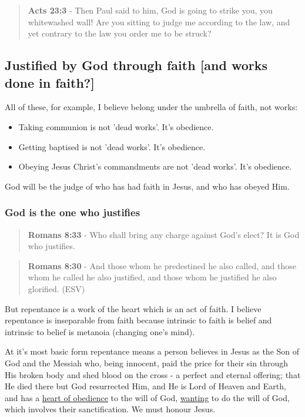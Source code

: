 \documentclass[11pt]{article}
\begin{document}
\begin{quote}
\textbf{Acts 23:3} - Then Paul said to him, God is going to strike you, you whitewashed wall! Are you sitting to judge me according to the law, and yet contrary to the law you order me to be struck?
\end{quote}

\subsection{Justified by God through faith [and works done in faith?]}
\label{sec:org3b4adf2}
All of these, for example,  I believe belong under the umbrella of faith, not works:
\begin{itemize}
\item Taking communion is not 'dead works'. It's obedience.
\item Getting baptised is not 'dead works'. It's obedience.
\item Obeying Jesus Christ's commandments are not 'dead works'. It's obedience.
\end{itemize}

God will be the judge of who has had faith in Jesus, and who has obeyed Him.

\subsubsection{God is the one who justifies}
\label{sec:org11025f8}

\begin{quote}
\textbf{Romans 8:33} - Who shall bring any charge against God's elect? It is God who justifies.
\end{quote}

\begin{quote}
\textbf{Romans 8:30} - And those whom he predestined he also called, and those whom he called he also justified, and those whom he justified he also glorified. (ESV)
\end{quote}

But repentance is a work of the heart which is an act of faith.
I believe repentance is inseparable from faith because intrinsic to faith is belief and intrinsic to belief is metanoia (changing one's mind).

At it's most basic form repentance means a
person believes in Jesus as the Son of God and the Messiah who, being innocent, paid the
price for their sin through His broken body
and shed blood on the cross - a perfect and
eternal offering; that He died there but God
resurrected Him, and He is Lord of Heaven and
Earth, and has a \uline{heart of obedience} to the will of God,
\uline{wanting} to do the will of God, which involves their sanctification.
We must honour Jesus.
\end{document}
